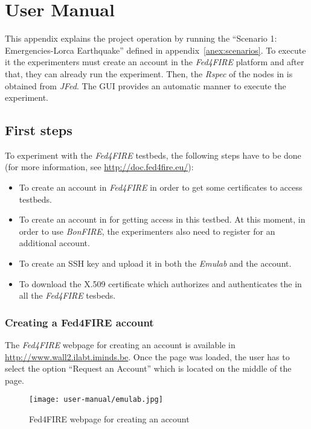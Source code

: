 \chapter{User Manual}

This appendix explains the project operation by running the ``Scenario 1:
Emergencies-Lorca Earthquake'' defined in appendix~\ref{anex:scenarios}. To
execute it the experimenters must create an account in the \emph{Fed4FIRE} platform
and after that, they can already run the experiment. Then, the \emph{Rspec} of the nodes in
\vw is obtained from \emph{JFed}. The \ac{GUI} provides an
automatic manner to execute the experiment.

\section{First steps}

To experiment with the \emph{Fed4FIRE} testbeds, the following steps have to be
done (for more information, see \url{http://doc.fed4fire.eu/}): 
\begin{itemize}
\item To create an account in \emph{Fed4FIRE} in order to get some certificates
  to access testbeds.
\item To create an account in \bonfire for getting access in this testbed. At
  this moment, in order to use \emph{BonFIRE}, the experimenters also need to register for an additional account. 
\item To create an \ac{SSH} key and upload it in both the \emph{Emulab} and the
  \bonfire account.
\item To download the X.509 certificate which authorizes and authenticates the
  in all the \emph{Fed4FIRE} tesbeds.
\end{itemize}

\subsection{Creating a Fed4FIRE account}

The \emph{Fed4FIRE} webpage for creating an account is available in
\url{http://www.wall2.ilabt.iminds.be}. Once the page was loaded, the user has
to select the option ``Request an Account'' which is located on the middle of the page.

\begin{figure}[!h]
\begin{center}
\texttt{[image: user-manual/emulab.jpg]}
\caption{Fed4FIRE webpage for creating an account}
\label{fig:fed4fire-account}
\end{center}
\end{figure}

